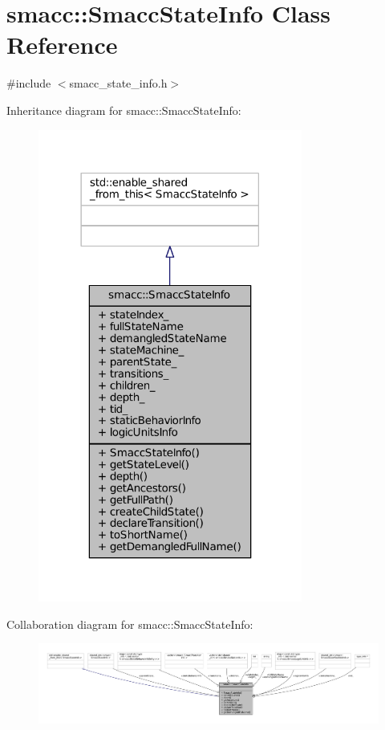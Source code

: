 \hypertarget{classsmacc_1_1SmaccStateInfo}{}\section{smacc\+:\+:Smacc\+State\+Info Class Reference}
\label{classsmacc_1_1SmaccStateInfo}


{\ttfamily \#include $<$smacc\+\_\+state\+\_\+info.\+h$>$}



Inheritance diagram for smacc\+:\+:Smacc\+State\+Info\+:
\nopagebreak
\begin{figure}[H]
\begin{center}
\leavevmode
\includegraphics[width=246pt]{classsmacc_1_1SmaccStateInfo__inherit__graph}
\end{center}
\end{figure}


Collaboration diagram for smacc\+:\+:Smacc\+State\+Info\+:
\nopagebreak
\begin{figure}[H]
\begin{center}
\leavevmode
\includegraphics[width=350pt]{classsmacc_1_1SmaccStateInfo__coll__graph}
\end{center}
\end{figure}
